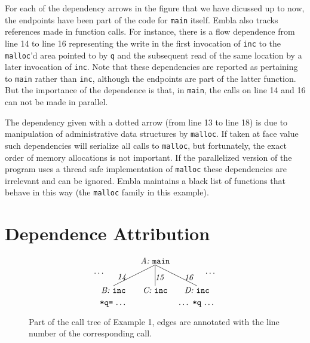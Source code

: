 \documentclass{acm_proc_article-sp}
\begin{document}
For each of the dependency arrows in the figure that 
we have dicussed up to now, the endpoints have been part of the 
code for {\tt main}
itself. Embla also tracks references made in function calls. For
instance, there is a flow dependence from line 14 to line 16
representing the write in the first invocation of {\tt inc} to the 
{\tt malloc}'d area pointed to by {\tt q} and the subsequent read 
of the same location by a later invocation of {\tt inc}. 
Note that these dependencies 
are reported as pertaining to {\tt main} rather than {\tt inc},
although the endpoints are part of the latter function. 
But the importance of the dependence is that, in {\tt main}, the calls
on line 14 and 16 can not be made in parallel.

The dependency given with a dotted arrow 
(from line 13 to line 18) is due to manipulation of administrative 
data structures by {\tt malloc}. If taken at face value such dependencies will
serialize all calls to {\tt malloc}, but fortunately, the exact order
of memory allocations is not important. If the 
parallelized version of the program uses a thread safe 
implementation of {\tt malloc} these dependencies are irrelevant and
can be ignored. Embla maintains a black list of functions that behave 
in this way (the {\tt malloc} family in this example).





\section{Dependence Attribution}

\begin{figure} \small
\hrulefill
\[
\begin{picture}(160,60)(70,15)
\put(120,65){\makebox(60,10)[c]{\it A:\ \tt main}}
\put(150,65){\line(-2,-1){50}}
\put(150,65){\line( 0,-1){25}}
\put(150,65){\line( 2,-1){50}}
\put(95,45){\makebox(20,10)[r]{\it 14}}
\put(150,45){\makebox(20,10)[l]{\it 15}}
\put(185,45){\makebox(20,10)[l]{\it 16}}
\put(70,50){\makebox(20,10)[r]{\ldots}}
\put(210,50){\makebox(20,10)[l]{\ldots}}
\put(170,30){\makebox(60,10)[c]{\it D:\ \tt inc}}
\put(120,30){\makebox(60,10)[c]{\it C:\ \tt inc}}
\put(70,30){\makebox(60,10)[c]{\it B:\ \tt inc}}
\put(70,15){\makebox(60,10)[cb]{{\tt *q=}\ \ldots}}
\put(170,15){\makebox(60,10)[cb]{\ldots\ {\tt *q}\ \ldots}}
\end{picture}
\]
\hrulefill
\caption{Part of the call tree of Example 1, edges are annotated 
with the line number of the corresponding call.} 
\label{ffextree}
\end{figure}
\end{document}
